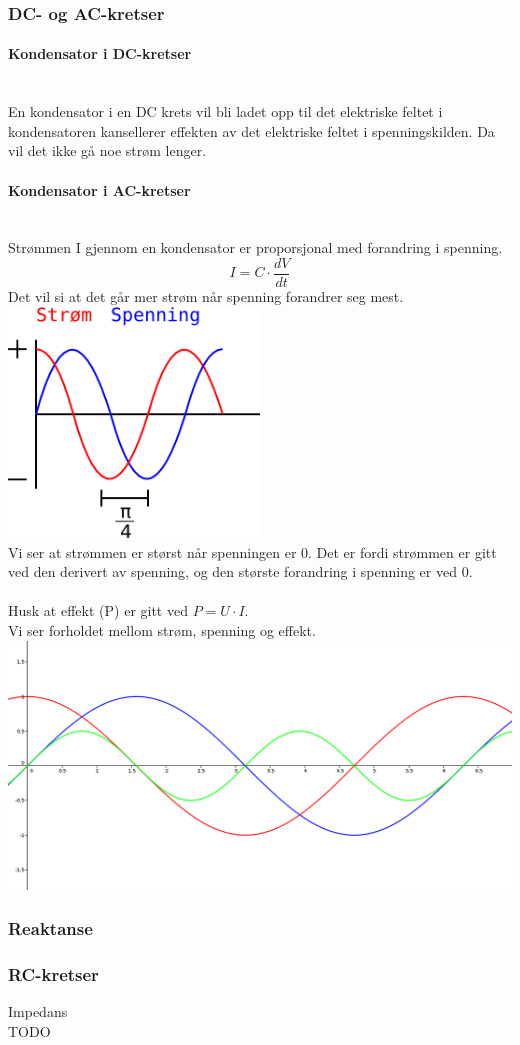 \subsubsection{DC- og AC-kretser}
\paragraph{Kondensator i DC-kretser} \mbox{} \\
En kondensator i en DC krets vil bli ladet opp
til det elektriske feltet i kondensatoren kansellerer effekten av
det elektriske feltet i spenningskilden.
Da vil det ikke gå noe strøm lenger.

\paragraph{Kondensator i AC-kretser} \mbox{} \\
Strømmen I gjennom en kondensator er proporsjonal med forandring i spenning.
$$I = C \cdot \frac{dV}{dt}$$
Det vil si at det går mer strøm når spenning forandrer seg mest. \\
\includegraphics[width=0.5\textwidth]{./img/kondensator-spenning} \\
Vi ser at strømmen er størst når spenningen er 0.
Det er fordi strømmen er gitt ved den derivert av spenning,
og den største forandring i spenning er ved 0.
\\\\
Husk at {\color{green} effekt (P)} er gitt ved $P = U \cdot I$. \\
Vi ser forholdet mellom strøm, spenning og effekt. \\
\includegraphics[width=\textwidth]{./img/kondensator-power} \\



\subsubsection{Reaktanse}




\subsubsection{RC-kretser}
Impedans \\
TODO
